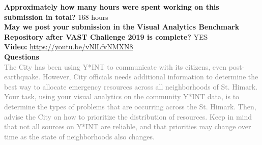 \documentclass{article}
\begin{document}
\noindent
\textbf{Approximately how many hours were spent working on this submission in
total?} 168 hours \\

\noindent
\textbf{May we post your submission in the Visual Analytics Benchmark Repository
after VAST Challenge 2019 is complete?} YES \\

\noindent
\textbf{Video:} \url{https://youtu.be/vNlLfvNMXN8}\\

\noindent
\textbf{Questions} \\
\footnotesize{\textcolor{gray}{The City has been using Y*INT to communicate with
its citizens, even post-earthquake. However, City officials needs additional
information to determine the best way to allocate emergency resources across all
neighborhoods of St. Himark. Your task, using your visual analytics on the
community Y*INT data, is to determine the types of problems that are occurring
across the St.  Himark. Then, advise the City on how to prioritize the
distribution of resources. Keep in mind that not all sources on Y*INT are
reliable, and that priorities may change over time as the state of neighborhoods
also changes.}}
\end{document}
